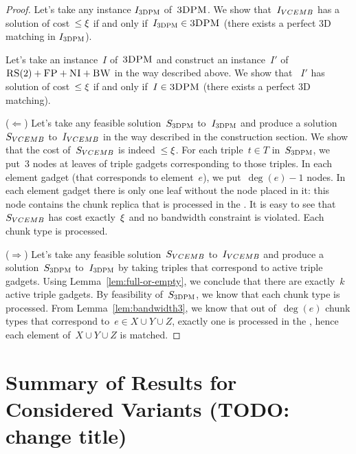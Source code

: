 \begin{proof}
  Let's take any instance $I_{\textsc{3DPM}}$ of~$\textsc{3DPM}$.
  We show that~$I_{VCEMB}$ has a solution of cost~$\leq \xi$ if and only if~$I_{\textsc{3DPM}} \in \textsc{3DPM}$ (there exists a perfect 3D matching in $I_{\textsc{3DPM}}$).


  Let's take an instance~$I$ of~$\textsc{3DPM}$ and construct an instance~$I'$
  of~$\textsc{RS}(2)+\textsc{FP}+\textsc{NI}+\textsc{BW}$ in the way described above.  We show that
 ~$I'$ has solution of cost~$\leq \xi$ if and only if~$I \in \textsc{3DPM}$
  (there exists a perfect 3D matching).

  ($\Leftarrow$) Let's take any feasible solution~$S_{\textsc{3DPM}}$ to~$I_{\textsc{3DPM}}$ and
  produce a solution~$S_{VCEMB}$ to~$I_{VCEMB}$ in the way described in the construction section. We show that the cost of~$S_{VCEMB}$ is
  indeed~$\leq \xi$.
  For each triple~$t\in T$ in~$S_{\textsc{3DPM}}$, we put~$3$ nodes at
  leaves of triple gadgets corresponding to those triples.  In each
  element gadget (that corresponds to element~$e$), we put~$\deg(e)-1$
  nodes. In each element gadget there is only one leaf without the
  node placed in it: this node contains the chunk replica that is
  processed in the {\MatchSubtree}.
  It is easy to see that~$S_{VCEMB}$ has cost exactly~$\xi$ and no
  bandwidth constraint is violated. Each chunk type is processed.

  ($\Rightarrow$) Let's take any feasible solution~$S_{VCEMB}$ to~$I_{VCEMB}$ and
  produce a solution~$S_{\textsc{3DPM}}$ to~$I_{\textsc{3DPM}}$ by taking triples that correspond
  to active triple gadgets. Using Lemma~\ref{lem:full-or-empty}, we
  conclude that there are exactly~$k$ active triple gadgets. By
  feasibility of~$S_{\textsc{3DPM}}$, we know that each chunk type is
  processed. From Lemma~\ref{lem:bandwidth3}, we know that out
  of~$\deg(e)$ chunk types that correspond to~$e\in X\cup Y\cup Z$,
  exactly one is processed in the {\MatchSubtree}, hence each
  element of~$X\cup Y\cup Z$ is matched.
\end{proof}


\section{Summary of Results for Considered Variants (TODO: change title)}\label{sec:conclusion}

